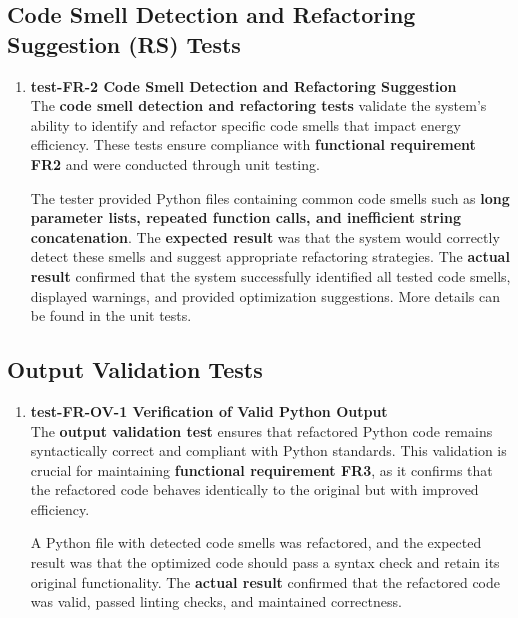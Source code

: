\documentclass[12pt, titlepage]{article}
\begin{document}
\subsection{Code Smell Detection and Refactoring Suggestion (RS) Tests}
\begin{enumerate}
  \item \textbf{test-FR-2 Code Smell Detection and Refactoring
    Suggestion} \\[2mm]
    The \textbf{code smell detection and refactoring tests} validate
    the system’s ability to identify and refactor specific code
    smells that impact energy efficiency. These tests ensure
    compliance with \textbf{functional requirement FR2} and were
    conducted through unit testing.

    The tester provided Python files containing common code smells
    such as \textbf{long parameter lists, repeated function calls,
    and inefficient string concatenation}. The \textbf{expected
    result} was that the system would correctly detect these smells
    and suggest appropriate refactoring strategies. The
    \textbf{actual result} confirmed that the system successfully
    identified all tested code smells, displayed warnings, and
    provided optimization suggestions. More details can be found in
    the unit tests.
\end{enumerate}

\subsection{Output Validation Tests}
\begin{enumerate}
  \item \textbf{test-FR-OV-1 Verification of Valid Python Output} \\[2mm]
    The \textbf{output validation test} ensures that refactored
    Python code remains syntactically correct and compliant with
    Python standards. This validation is crucial for maintaining
    \textbf{functional requirement FR3}, as it confirms that the
    refactored code behaves identically to the original but with
    improved efficiency.

    A Python file with detected code smells was refactored, and the
    expected result was that the optimized code should pass a syntax
    check and retain its original functionality. The \textbf{actual
    result} confirmed that the refactored code was valid, passed
    linting checks, and maintained correctness.
\end{enumerate}
\end{document}
